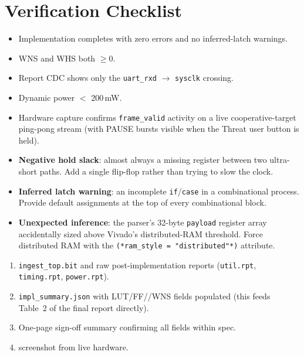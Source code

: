 \documentclass[11pt,letterpaper]{article}
\begin{document}
\section{Verification Checklist}
\begin{itemize}[leftmargin=2em]
	\item[$\square$] Implementation completes with zero errors and no inferred-latch warnings.
	\item[$\square$] WNS and WHS both $\geq 0$.
	\item[$\square$] Report CDC shows only the \texttt{uart\_rxd} $\to$ \texttt{sysclk} crossing.
	\item[$\square$] Dynamic power $<$ 200\,mW.
	\item[$\square$] Hardware \ILA{} capture confirms \texttt{frame\_valid} activity on a live cooperative-target ping-pong stream (with PAUSE bursts visible when the Threat user button is held).
\end{itemize}

\begin{tcolorbox}[warning={Common Pitfalls}]
	\begin{itemize}[leftmargin=1.2em]
		\item \textbf{Negative hold slack}: almost always a missing register between two ultra-short paths. Add a single flip-flop rather than trying to slow the clock.
		\item \textbf{Inferred latch warning}: an incomplete \texttt{if}/\texttt{case} in a combinational process. Provide default assignments at the top of every combinational block.
		\item \textbf{Unexpected \BRAM{} inference}: the parser's 32-byte \texttt{payload} register array accidentally sized above Vivado's distributed-\mbox{RAM} threshold. Force distributed \mbox{RAM} with the \texttt{(*ram\_style = "distributed"*)} attribute.
	\end{itemize}
\end{tcolorbox}

\begin{tcolorbox}[deliverable={Lab Handout 2-H Deliverable}]
	\begin{enumerate}[leftmargin=1.2em]
		\item \texttt{ingest\_top.bit} and raw post-implementation reports (\texttt{util.rpt}, \texttt{timing.rpt}, \texttt{power.rpt}).
		\item \texttt{impl\_summary.json} with \mbox{LUT}/\mbox{FF}/\BRAM{}/WNS fields populated (this feeds Table~2 of the final report directly).
		\item One-page sign-off summary confirming all fields within spec.
		\item \ILA{} screenshot from live hardware.
	\end{enumerate}
\end{tcolorbox}

\printhandoutglossary
\end{document}
